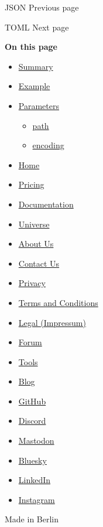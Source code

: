 { JSON } { Previous page }

\href{/docs/reference/data-loading/toml/}{\pandocbounded{}}

{ TOML } { Next page }

\textbf{On this page}

\begin{itemize}
\tightlist
\item
  \hyperref[summary]{Summary}
\item
  \hyperref[example]{Example}
\item
  \hyperref[parameters]{Parameters}

  \begin{itemize}
  \tightlist
  \item
    \hyperref[parameters-path]{path}
  \item
    \hyperref[parameters-encoding]{encoding}
  \end{itemize}
\end{itemize}

\begin{itemize}
\tightlist
\item
  \href{/}{Home}
\item
  \href{/pricing/}{Pricing}
\item
  \href{/docs/}{Documentation}
\item
  \href{/universe/}{Universe}
\item
  \href{/about/}{About Us}
\item
  \href{/contact/}{Contact Us}
\item
  \href{/privacy/}{Privacy}
\item
  \href{https://typst.app/terms}{Terms and Conditions}
\item
  \href{/legal/}{Legal (Impressum)}
\end{itemize}

\begin{itemize}
\tightlist
\item
  \href{https://forum.typst.app}{Forum}
\item
  \href{/tools/}{Tools}
\item
  \href{/blog/}{Blog}
\item
  \href{https://github.com/typst/}{GitHub}
\item
  \href{https://discord.gg/2uDybryKPe}{Discord}
\item
  \href{https://mastodon.social/@typst}{Mastodon}
\item
  \href{https://bsky.app/profile/typst.app}{Bluesky}
\item
  \href{https://www.linkedin.com/company/typst/}{LinkedIn}
\item
  \href{https://instagram.com/typstapp/}{Instagram}
\end{itemize}

Made in Berlin
